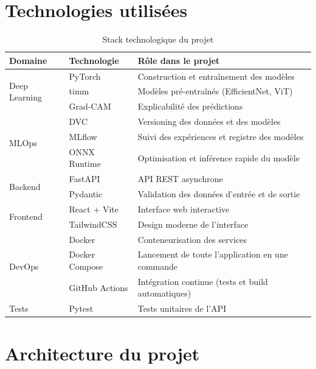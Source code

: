 \documentclass[11pt,a4paper]{article}
\begin{document}
\section{Technologies utilisées}

\begin{table}[H]
\centering
\caption{Stack technologique du projet}
\small
\begin{tabularx}{\linewidth}{@{}llX@{}}
\toprule
\textbf{Domaine} & \textbf{Technologie} & \textbf{Rôle dans le projet} \\
\midrule
\multirow{3}{*}{Deep Learning} & PyTorch & Construction et entraînement des modèles \\
 & timm & Modèles pré-entraînés (EfficientNet, ViT) \\
 & Grad-CAM & Explicabilité des prédictions \\
\midrule
\multirow{3}{*}{MLOps} & DVC & Versioning des données et des modèles \\
 & MLflow & Suivi des expériences et registre des modèles \\
 & ONNX Runtime & Optimisation et inférence rapide du modèle \\
\midrule
\multirow{2}{*}{Backend} & FastAPI & API REST asynchrone \\
 & Pydantic & Validation des données d'entrée et de sortie \\
\midrule
\multirow{2}{*}{Frontend} & React + Vite & Interface web interactive \\
 & TailwindCSS & Design moderne de l'interface \\
\midrule
\multirow{3}{*}{DevOps} & Docker & Conteneurisation des services \\
 & Docker Compose & Lancement de toute l'application en une commande \\
 & GitHub Actions & Intégration continue (tests et build automatiques) \\
\midrule
Tests & Pytest & Tests unitaires de l'API \\
\bottomrule
\end{tabularx}
\end{table}

\section{Architecture du projet}
\end{document}
